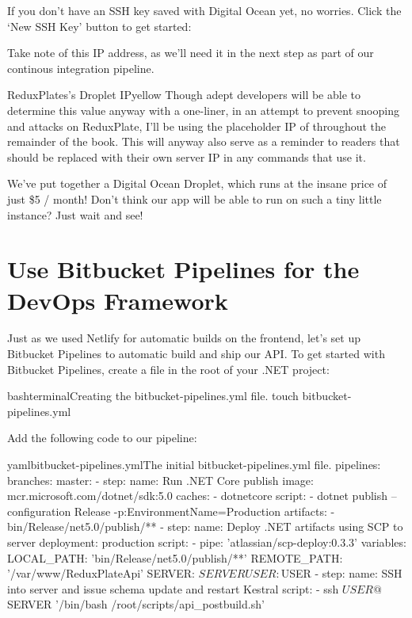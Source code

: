 \documentclass[a4paper,headinclude=on,footinclude=on,12pt,oneside]{scrbook}
\begin{document}

If you don't have an SSH key saved with Digital Ocean yet, no worries. Click the `New SSH Key' button to get started:

Take note of this IP address, as we'll need it in the next step as part of our continous integration pipeline.

\begin{highlightBox}{ReduxPlates's Droplet IP}{yellow}{\warning}
Though adept developers will be able to determine this value anyway with a one-liner, in an attempt to prevent snooping and attacks on ReduxPlate, I'll be using the placeholder IP of  throughout the remainder of the book. This will anyway also serve as a reminder to readers that  should be replaced with their own server IP in any commands that use it.
\end{highlightBox}


We've put together a Digital Ocean Droplet, which runs at the insane price of just \$5 / month! Don't think our app will be able to run on such a tiny little instance? Just wait and see!

\section{Use Bitbucket Pipelines for the DevOps Framework}

Just as we used Netlify for automatic builds on the frontend, let's set up Bitbucket Pipelines to automatic build and ship our API. To get started with Bitbucket Pipelines, create a  file in the root of your .NET project:

\begin{codeInput}{bash}{terminal}{Creating the bitbucket-pipelines.yml file.}
touch bitbucket-pipelines.yml  
\end{codeInput}

Add the following code to our pipeline:

\begin{codeInput}{yaml}{bitbucket-pipelines.yml}{The initial bitbucket-pipelines.yml file.}
pipelines:
  branches:
    master:
        - step:
            name: Run .NET Core publish
            image: mcr.microsoft.com/dotnet/sdk:5.0
            caches:
                - dotnetcore
            script:
                - dotnet publish --configuration Release -p:EnvironmentName=Production
            artifacts:
                - bin/Release/net5.0/publish/**
        - step:
            name: Deploy .NET artifacts using SCP to server
            deployment: production
            script:
                - pipe: 'atlassian/scp-deploy:0.3.3'
                  variables:
                    LOCAL_PATH: 'bin/Release/net5.0/publish/**'
                    REMOTE_PATH: '/var/www/ReduxPlateApi'
                    SERVER: $SERVER
                    USER: $USER
        - step:
            name: SSH into server and issue schema update and restart Kestral
            script:
                - ssh $USER@$SERVER '/bin/bash /root/scripts/api_postbuild.sh' 
\end{codeInput}
\end{document}
